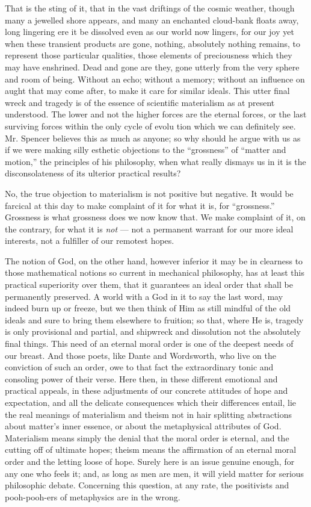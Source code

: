 \documentclass[]{article}
\begin{document}
That is the sting of it, that in the vast driftings of the cosmic weather, though many a jewelled shore appears, and many an enchanted cloud-bank floats away, long lingering ere it be dissolved even as our world now lingers, for our joy yet when these transient products are gone, nothing, absolutely nothing remains, to represent those particular qualities, those elements of preciousness which they may have enshrined. Dead and gone are they, gone utterly from the very sphere and room of being. Without an echo; without a memory; without an influence on aught that may come after, to make it care for similar ideals. This utter final wreck and tragedy is of the essence of scientific materialism as at present understood. The lower and not the higher forces are the eternal forces, or the last surviving forces within the only cycle of evolu tion which we can definitely see. Mr. Spencer believes this as much as anyone; so why should he argue with us as if we were making silly esthetic objections to the ``grossness'' of ``matter and motion,'' the principles of his philosophy, when what really dismays us in it is the disconsolateness of its ulterior practical results? 

No, the true objection to materialism is not positive but negative. It would be farcical at this day to make complaint of it for what it is, for ``grossness.'' Grossness is what grossness does we now know that. We make complaint of it, on the contrary, for what it is \emph{not} --- not a permanent warrant for our more ideal interests, not a fulfiller of our remotest hopes. 

The notion of God, on the other hand, however inferior it may be in clearness to those mathematical notions so current in mechanical philosophy, has at least this practical superiority over them, that it guarantees an ideal order that shall be permanently preserved. A world with a God in it to say the last word, may indeed burn up or freeze, but we then think of Him as still mindful of the old ideals and sure to bring them elsewhere to fruition; so that, where He is, tragedy is only provisional and partial, and shipwreck and dissolution not the absolutely final things. This need of an eternal moral order is one of the deepest needs of our breast. And those poets, like Dante and Wordsworth, who live on the conviction of such an order, owe to that fact the extraordinary tonic and consoling power of their verse. Here then, in these different emotional and practical appeals, in these adjustments of our concrete attitudes of hope and expectation, and all the delicate consequences which their differences entail, lie the real meanings of materialism and theism not in hair splitting abstractions about matter's inner essence, or about the metaphysical attributes of God. Materialism means simply the denial that the moral order is eternal, and the cutting off of ultimate hopes; theism means the affirmation of an eternal moral order and the letting loose of hope. Surely here is an issue genuine enough, for any one who feels it; and, as long as men are men, it will yield matter for serious philosophic debate. Concerning this question, at any rate, the positivists and pooh-pooh-ers of metaphysics are in the wrong. 
\end{document}
